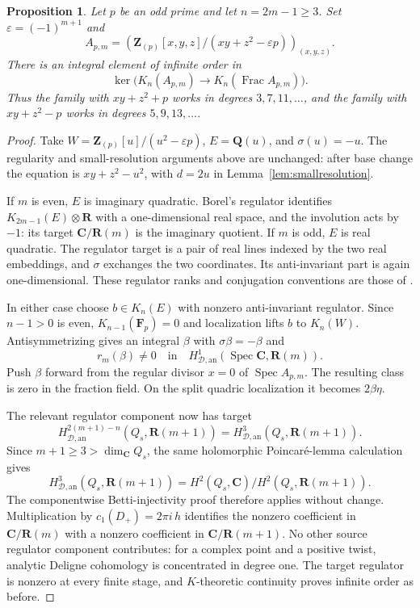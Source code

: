 \documentclass[11pt,a4paper]{article}
\newtheorem{proposition}[theorem]{Proposition}
\theoremstyle{remark}
\newcommand{\Q}{\mathbf Q}
\newcommand{\Z}{\mathbf Z}
\newcommand{\R}{\mathbf R}
\newcommand{\C}{\mathbf C}
\newcommand{\F}{\mathbf F}
\newcommand{\Spec}{\operatorname{Spec}}
\newcommand{\Frac}{\operatorname{Frac}}
\newcommand{\HD}{H_{\mathcal D,\mathrm{an}}}
\begin{document}
\begin{proposition}\label{prop:odddegrees}
Let $p$ be an odd prime and let $n=2m-1\geq3$. Set $\varepsilon=(-1)^{m+1}$ and
\[
A_{p,m}=\left(\Z_{(p)}[x,y,z]/(xy+z^2-\varepsilon p)\right)_{(x,y,z)}.
\]
There is an integral element of infinite order in
\[
\ker\bigl(K_n(A_{p,m})\longrightarrow K_n(\Frac A_{p,m})\bigr).
\]
Thus the family with $xy+z^2+p$ works in degrees $3,7,11,\ldots$, and the family with $xy+z^2-p$ works in degrees $5,9,13,\ldots$.
\end{proposition}
\begin{proof}
Take $W=\Z_{(p)}[u]/(u^2-\varepsilon p)$, $E=\Q(u)$, and $\sigma(u)=-u$. The regularity and small-resolution arguments above are unchanged: after base change the equation is $xy+z^2-u^2$, with $d=2u$ in Lemma~\ref{lem:smallresolution}.

If $m$ is even, $E$ is imaginary quadratic. Borel's regulator identifies $K_{2m-1}(E)\otimes\R$ with a one-dimensional real space, and the involution acts by $-1$: its target $\C/\R(m)$ is the imaginary quotient. If $m$ is odd, $E$ is real quadratic. The regulator target is a pair of real lines indexed by the two real embeddings, and $\sigma$ exchanges the two coordinates. Its anti-invariant part is again one-dimensional. These regulator ranks and conjugation conventions are those of \cite{Borel,BunkeTamme}.

In either case choose $b\in K_n(E)$ with nonzero anti-invariant regulator. Since $n-1>0$ is even, $K_{n-1}(\F_p)=0$ and localization lifts $b$ to $K_n(W)$. Antisymmetrizing gives an integral $\beta$ with $\sigma\beta=-\beta$ and
\[
r_m(\beta)\neq0\quad\text{in}\quad\HD^1(\Spec\C,\R(m)).
\]
Push $\beta$ forward from the regular divisor $x=0$ of $\Spec A_{p,m}$. The resulting class is zero in the fraction field. On the split quadric localization it becomes $2\beta\eta$.

The relevant regulator component now has target
\[
\HD^{2(m+1)-n}(Q_s,\R(m+1))
=\HD^3(Q_s,\R(m+1)).
\]
Since $m+1\geq3>\dim_{\C}Q_s$, the same holomorphic Poincar\'e-lemma calculation gives
\[
\HD^3(Q_s,\R(m+1))
=H^2(Q_s,\C)/H^2(Q_s,\R(m+1)).
\]
The componentwise Betti-injectivity proof therefore applies without change. Multiplication by $c_1(D_+)=2\pi i\,h$ identifies the nonzero coefficient in $\C/\R(m)$ with a nonzero coefficient in $\C/\R(m+1)$. No other source regulator component contributes: for a complex point and a positive twist, analytic Deligne cohomology is concentrated in degree one. The target regulator is nonzero at every finite stage, and $K$-theoretic continuity proves infinite order as before.
\end{proof}
\end{document}
